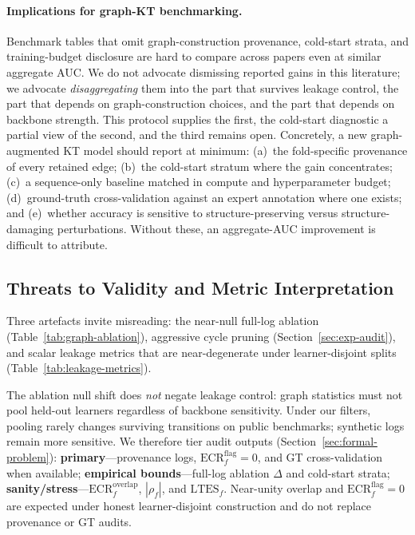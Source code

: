 \documentclass[preprint,10pt,doubleblind]{elsarticle}
\begin{document}
\paragraph{Implications for graph-KT benchmarking.}
Benchmark tables that omit graph-construction provenance, cold-start strata,
and training-budget disclosure are hard to compare across papers even at
similar aggregate AUC. We do not advocate dismissing reported gains in this
literature; we advocate \emph{disaggregating} them into the part that survives
leakage control, the part that depends on graph-construction choices, and the
part that depends on backbone strength. This protocol supplies the first, the
cold-start diagnostic a partial view of the second, and the third remains open.
Concretely, a new graph-augmented KT model should report at minimum: (a)~the
fold-specific provenance of every retained edge; (b)~the cold-start stratum
where the gain concentrates; (c)~a sequence-only baseline matched in compute
and hyperparameter budget; (d)~ground-truth cross-validation against an expert
annotation where one exists; and (e)~whether accuracy is sensitive to
structure-preserving versus structure-damaging perturbations. Without these, an
aggregate-AUC improvement is difficult to attribute.

\subsection{Threats to Validity and Metric Interpretation}
\label{sec:threats-validity}
Three artefacts invite misreading: the near-null full-log ablation
(Table~\ref{tab:graph-ablation}), aggressive cycle pruning
(Section~\ref{sec:exp-audit}), and scalar leakage metrics that are near-degenerate under learner-disjoint
splits (Table~\ref{tab:leakage-metrics}).

The ablation null shift does \emph{not} negate leakage control: graph
statistics must not pool held-out learners regardless of backbone
sensitivity. Under our filters, pooling rarely changes surviving transitions on
public benchmarks; synthetic logs remain more sensitive. We therefore tier audit
outputs (Section~\ref{sec:formal-problem}): \textbf{primary}---provenance logs,
$\mathrm{ECR}^{\mathrm{flag}}_f{=}0$, and GT cross-validation when available;
\textbf{empirical bounds}---full-log ablation $\Delta$ and cold-start strata;
\textbf{sanity/stress}---$\mathrm{ECR}^{\mathrm{overlap}}_f$, $|\rho_f|$, and
$\mathrm{LTES}_f$. Near-unity overlap and $\mathrm{ECR}^{\mathrm{flag}}_f{=}0$
are expected under honest learner-disjoint construction and do not replace
provenance or GT audits.
\end{document}
